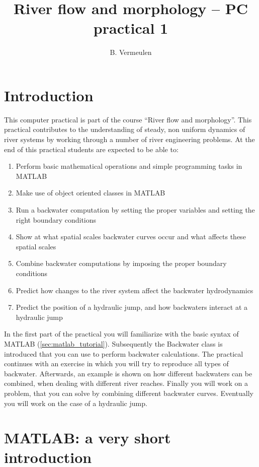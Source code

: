 \documentclass[a4paper]{article}
\title{River flow and morphology -- PC practical 1}
\author{B. Vermeulen}
\begin{document}
\maketitle
\tableofcontents

\section{Introduction}
\label{sec:intro}
This computer practical is part of the course ``River flow and morphology''. This practical contributes to the understanding of steady, non uniform dynamics of river systems by working through a number of river engineering problems. At the end of this practical students are expected to be able to: 
\begin{enumerate}
  \item Perform basic mathematical operations and simple programming tasks in MATLAB
  \item Make use of object oriented classes in MATLAB
  \item Run a backwater computation by setting the proper variables and setting the right boundary conditions
  \item Show at what spatial scales backwater curves occur and what affects these spatial scales
  \item Combine backwater computations by imposing the proper boundary conditions
  \item Predict how changes to the river system affect the backwater hydrodynamics
  \item Predict the position of a hydraulic jump, and how backwaters interact at a hydraulic jump
\end{enumerate}

In the first part of the practical you will familiarize with the basic syntax of MATLAB (\autoref{sec:matlab_tutorial}).
Subsequently the Backwater class is introduced that you can use to perform backwater calculations.
The practical continues with an exercise in which you will try to reproduce all types of backwater.
Afterwards, an example is shown on how different backwaters can be combined, when dealing with different river reaches. 
Finally you will work on a problem, that you can solve by combining different backwater curves.
Eventually you will work on the case of a hydraulic jump.
 
\section{MATLAB: a very short introduction}
\label{sec:matlab_tutorial}
\end{document}
